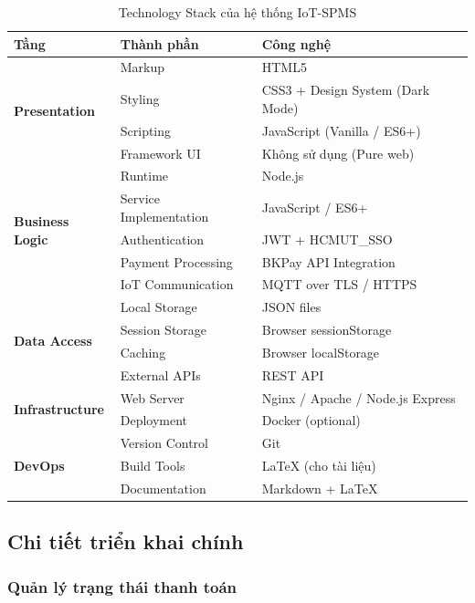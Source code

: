 \begin{table}[H]
    \centering
    \begin{tabularx}{\textwidth}{|l|X|l|}
    \hline
    \textbf{Tầng} & \textbf{Thành phần} & \textbf{Công nghệ} \\
    \hline
    \multirow{4}{*}{\textbf{Presentation}} 
    & Markup & HTML5 \\
    & Styling & CSS3 + Design System (Dark Mode) \\
    & Scripting & JavaScript (Vanilla / ES6+) \\
    & Framework UI & Không sử dụng (Pure web) \\
    \hline
    \multirow{5}{*}{\textbf{Business Logic}} 
    & Runtime & Node.js \\
    & Service Implementation & JavaScript / ES6+ \\
    & Authentication & JWT + HCMUT\_SSO \\
    & Payment Processing & BKPay API Integration \\
    & IoT Communication & MQTT over TLS / HTTPS \\
    \hline
    \multirow{4}{*}{\textbf{Data Access}} 
    & Local Storage & JSON files \\
    & Session Storage & Browser sessionStorage \\
    & Caching & Browser localStorage \\
    & External APIs & REST API \\
    \hline
    \multirow{2}{*}{\textbf{Infrastructure}} 
    & Web Server & Nginx / Apache / Node.js Express \\
    & Deployment & Docker (optional) \\
    \hline
    \multirow{3}{*}{\textbf{DevOps}} 
    & Version Control & Git \\
    & Build Tools & LaTeX (cho tài liệu) \\
    & Documentation & Markdown + LaTeX \\
    \hline
    \end{tabularx}
    \caption{Technology Stack của hệ thống IoT-SPMS}
    \label{tech_stack}
\end{table}

\subsection{Chi tiết triển khai chính}

\subsubsection{Quản lý trạng thái thanh toán}

